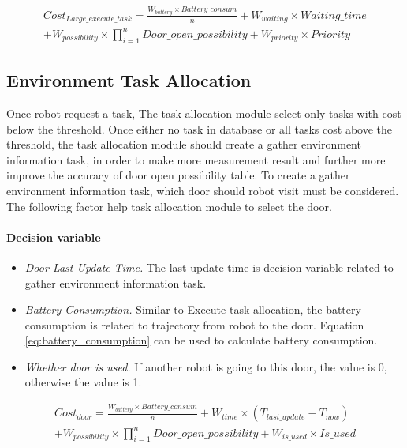 \begin{equation}
	\label{eq:large_execute_task_cost}
	\begin{split}
	Cost_{Large\_execute\_task} = \frac{W_{battery} \times Battery\_consum}{n} + W_{waiting} \times Waiting\_time \\
	+ W_{possibility} \times \prod\limits_{i=1}^n Door\_open\_possibility  + W_{priority} \times Priority
	\end{split}
\end{equation}


\subsection{Environment Task Allocation}
Once robot request a task, The task allocation module select only tasks with cost below the threshold. Once either no task in database or all tasks cost above the threshold, 
the task allocation module should create a gather environment information task, in order to make more measurement result and further more improve the accuracy of door open possibility table.
To create a gather environment information task, which door should robot visit must be considered. The following factor help task allocation module to select the door.

\paragraph*{Decision variable}
\begin{itemize}
	\item \textsl{Door Last Update Time.} The last update time is decision variable related to gather environment information task.
	\item \textsl{Battery Consumption.} Similar to Execute-task allocation, the battery consumption is related to trajectory from robot to the door. Equation \ref{eq:battery_consumption} can be used to calculate battery consumption.
	\item \textsl{Whether door is used.} If another robot is going to this door, the value is 0, otherwise the value is 1.
\end{itemize}

\begin{equation}
	\label{eq:door_cost}
	\begin{split}
	Cost_{door} = \frac{W_{battery} \times Battery\_consum}{n} + W_{time} \times (T_{last\_update} - T_{now}) \\
	+ W_{possibility} \times \prod\limits_{i=1}^n Door\_open\_possibility + W_{is\_used} \times Is\_used  
	\end{split}
\end{equation}

